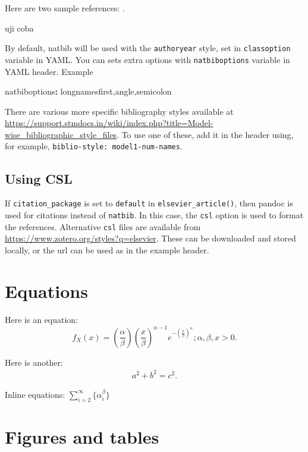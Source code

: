 \documentclass[preprint, 3p,
authoryear]{elsarticle} %
\newenvironment{Shaded}{\begin{snugshade}}{\end{snugshade}}
\newcommand{\AttributeTok}[1]{\textcolor[rgb]{0.77,0.63,0.00}{#1}}
\newcommand{\FunctionTok}[1]{\textcolor[rgb]{0.00,0.00,0.00}{#1}}
\newcommand{\KeywordTok}[1]{\textcolor[rgb]{0.13,0.29,0.53}{\textbf{#1}}}
\begin{document}
Here are two sample references: \citet{Feynman1963118}.

uji coba \citep{Dirac1953888}

By default, natbib will be used with the \texttt{authoryear} style, set
in \texttt{classoption} variable in YAML. You can sets extra options
with \texttt{natbiboptions} variable in YAML header. Example

\begin{Shaded}
\begin{Highlighting}[]
\FunctionTok{natbiboptions}\KeywordTok{:}\AttributeTok{ longnamesfirst,angle,semicolon}
\end{Highlighting}
\end{Shaded}

There are various more specific bibliography styles available at
\url{https://support.stmdocs.in/wiki/index.php?title=Model-wise_bibliographic_style_files}.
To use one of these, add it in the header using, for example,
\texttt{biblio-style:\ model1-num-names}.

\hypertarget{using-csl}{%
\subsection{Using CSL}\label{using-csl}}

If \texttt{citation\_package} is set to \texttt{default} in
\texttt{elsevier\_article()}, then pandoc is used for citations instead
of \texttt{natbib}. In this case, the \texttt{csl} option is used to
format the references. Alternative \texttt{csl} files are available from
\url{https://www.zotero.org/styles?q=elsevier}. These can be downloaded
and stored locally, or the url can be used as in the example header.

\hypertarget{equations}{%
\section{Equations}\label{equations}}

Here is an equation: \[ 
  f_{X}(x) = \left(\frac{\alpha}{\beta}\right)
  \left(\frac{x}{\beta}\right)^{\alpha-1}
  e^{-\left(\frac{x}{\beta}\right)^{\alpha}}; 
  \alpha,\beta,x > 0 .
\]

Here is another: \begin{align}
  a^2+b^2=c^2.
\end{align}

Inline equations: \(\sum_{i = 2}^\infty\{\alpha_i^\beta\}\)

\hypertarget{figures-and-tables}{%
\section{Figures and tables}\label{figures-and-tables}}
\end{document}
